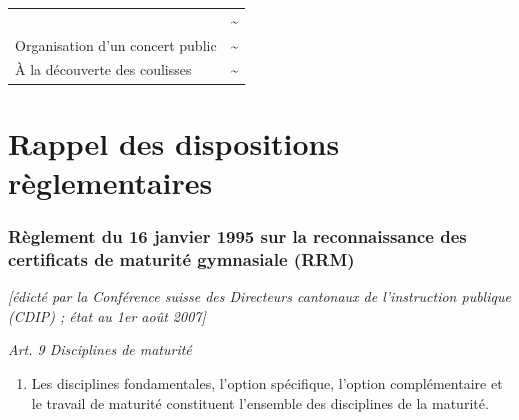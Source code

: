 \documentclass[
  10pt,
  french,
  a5paper,
  openany]{book}
\providecommand{\tightlist}{%
  \setlength{\itemsep}{0pt}\setlength{\parskip}{0pt}}
\begin{document}
\begin{longtable}[]{@{}lc@{}}
\begin{minipage}[t]{0.88\columnwidth}
\end{minipage} & \begin{minipage}[t]{0.06\columnwidth}\centering
\textasciitilde{}\strut
\end{minipage}\tabularnewline
\begin{minipage}[t]{0.88\columnwidth}\raggedright
Organisation d'un concert public\strut
\end{minipage} & \begin{minipage}[t]{0.06\columnwidth}\centering
\textasciitilde{}\strut
\end{minipage}\tabularnewline
\begin{minipage}[t]{0.88\columnwidth}\raggedright
À la découverte des coulisses\strut
\end{minipage} & \begin{minipage}[t]{0.06\columnwidth}\centering
\textasciitilde{}\strut
\end{minipage}\tabularnewline
\bottomrule
\end{longtable}

\hypertarget{rappel-des-dispositions-ruxe8glementaires}{%
\chapter*{Rappel des dispositions règlementaires}\label{rappel-des-dispositions-ruxe8glementaires}}

\hypertarget{ruxe8glement-du-16-janvier-1995-sur-la-reconnaissance-des-certificats-de-maturituxe9-gymnasiale-rrm}{%
\subsection*{Règlement du 16 janvier 1995 sur la reconnaissance des certificats de maturité gymnasiale (RRM)}\label{ruxe8glement-du-16-janvier-1995-sur-la-reconnaissance-des-certificats-de-maturituxe9-gymnasiale-rrm}}

\emph{{[}édicté par la Conférence suisse des Directeurs cantonaux de l'instruction publique (CDIP) ; état au 1er août 2007{]}}


\emph{Art. 9 Disciplines de maturité}

\begin{enumerate}
\def\labelenumi{\arabic{enumi}.}
\tightlist
\item
  Les disciplines fondamentales, l'option spécifique, l'option complémentaire et le travail de maturité constituent l'ensemble des disciplines de la maturité.
\end{enumerate}
\end{document}
